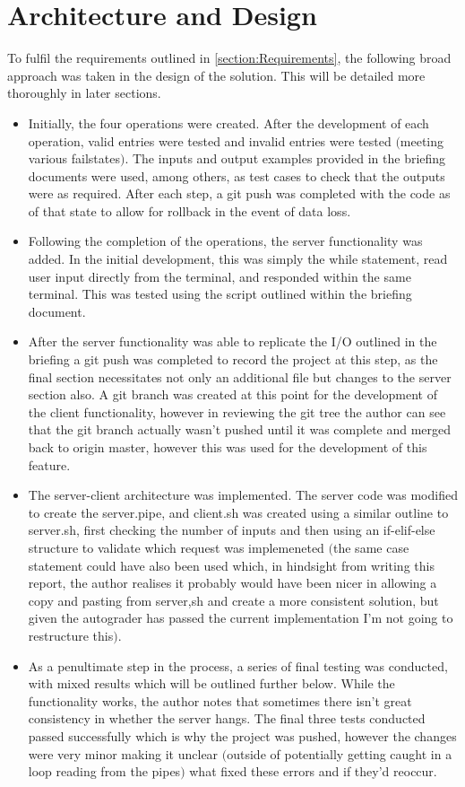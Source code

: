 \documentclass[11pt]{article}
\theoremstyle{plain}
\theoremstyle{definition}
\begin{document}
\section{Architecture and Design}\label{section:Architecture}
To fulfil the requirements outlined in \ref{section:Requirements}, the following broad approach was taken in the design of the solution. This will be detailed more thoroughly in later sections.
\begin{itemize}
	\item Initially, the four operations were created. After the development of each operation, valid entries were tested and invalid entries were tested $($meeting various failstates$)$. The inputs and output examples provided in the briefing documents were used, among others, as test cases to check that the outputs were as required. After each step, a git push was completed with the code as of that state to allow for rollback in the event of data loss.
	\item Following the completion of the operations, the server functionality was added. In the initial development, this was simply the while statement, read user input directly from the terminal, and responded within the same terminal. This was tested using the script outlined within the briefing document.
	\item After the server functionality was able to replicate the I/O outlined in the briefing a git push was completed to record the project at this step, as the final section necessitates not only an additional file but changes to the server section also. A git branch was created at this point for the development of the client functionality, however in reviewing the git tree the author can see that the git branch actually wasn't pushed until it was complete and merged back to origin master, however this was used for the development of this feature.
	\item The server-client architecture was implemented. The server code was modified to create the server.pipe, and client.sh was created using a similar outline to server.sh, first checking the number of inputs and then using an if-elif-else structure to validate which request was implemeneted $($the same case statement could have also been used which, in hindsight from writing this report, the author realises it probably would have been nicer in allowing a copy and pasting from server,sh and create a more consistent solution, but given the autograder has passed the current implementation I'm not going to restructure this$)$.
	\item As a penultimate step in the process, a series of final testing was conducted, with mixed results which will be outlined further below. While the functionality works, the author notes that sometimes there isn't great consistency in whether the server hangs. The final three tests conducted passed successfully which is why the project was pushed, however the changes were very minor making it unclear $($outside of potentially getting caught in a loop reading from the pipes$)$ what fixed these errors and if they'd reoccur.

\end{itemize}
\end{document}
